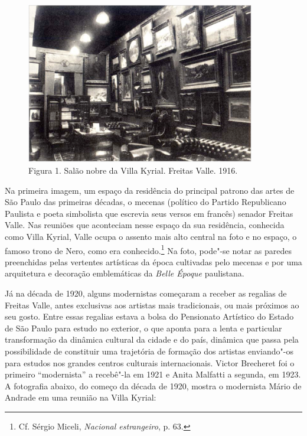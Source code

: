 \begin{figure}[!ht]
\centering
 \includegraphics[width=100mm]{./imgs/fig1.jpg}
\caption{Figura 1. Salão nobre da Villa Kyrial. Freitas Valle. 1916.}
\end{figure}

Na primeira imagem, um espaço da residência do principal patrono das
artes de São Paulo das primeiras décadas, o mecenas (político do Partido
Republicano Paulista e poeta simbolista que escrevia seus versos em
francês) senador Freitas Valle. Nas reuniões que aconteciam nesse espaço
da sua residência, conhecida como Villa Kyrial, Valle ocupa o assento
mais alto central na foto e no espaço, o famoso trono de Nero, como era
conhecido.\footnote{Cf. Sérgio Miceli, \emph{Nacional estrangeiro}, p.
  63.} Na foto, pode"-se notar as paredes preenchidas pelas vertentes
artísticas da época cultivadas pelo mecenas e por uma arquitetura e
decoração emblemáticas da \emph{Belle Époque} paulistana.

Já na década de 1920, alguns modernistas começaram a receber as regalias
de Freitas Valle, antes exclusivas aos artistas mais tradicionais, ou
mais próximos ao seu gosto. Entre essas regalias estava a bolsa do
Pensionato Artístico do Estado de São Paulo para estudo no exterior, o
que aponta para a lenta e particular transformação da dinâmica cultural
da cidade e do país, dinâmica que passa pela possibilidade de constituir
uma trajetória de formação dos artistas enviando"-os para estudos nos
grandes centros culturais internacionais. Victor Brecheret foi o
primeiro ``modernista'' a recebê"-la em 1921 e Anita Malfatti a segunda,
em 1923. A fotografia abaixo, do começo da década de 1920, mostra o
modernista Mário de Andrade em uma reunião na Villa Kyrial:

